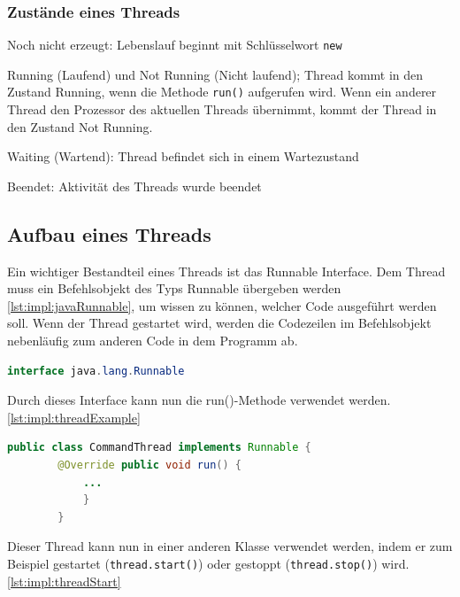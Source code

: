 \subsubsection{Zustände eines Threads}
\begin{compactitem}
    \item Noch nicht erzeugt: Lebenslauf beginnt mit Schlüsselwort \texttt{new}
    \item Running (Laufend) und Not Running (Nicht laufend); Thread kommt in den Zustand Running, wenn die Methode \texttt{run()} aufgerufen wird. Wenn ein anderer Thread den Prozessor des aktuellen Threads übernimmt, kommt der Thread in den Zustand Not Running.    
    \item Waiting (Wartend): Thread befindet sich in einem Wartezustand
    \item Beendet: Aktivität des Threads wurde beendet
\end{compactitem}
\cite{javaInselBuch} 

\subsection{Aufbau eines Threads}
Ein wichtiger Bestandteil eines Threads ist das Runnable Interface. 
Dem Thread muss ein Befehlsobjekt des Typs Runnable übergeben werden \ref{lst:impl:javaRunnable}, um wissen zu können, welcher Code ausgeführt werden soll.
Wenn der Thread gestartet wird, werden die Codezeilen im Befehlsobjekt nebenläufig zum anderen Code in dem Programm ab. \cite{javaInselBuch}
 
\begin{lstlisting}[language=java,caption=Java Runnable,label=lst:impl:javaRunnable]
    interface java.lang.Runnable
\end{lstlisting}
 
Durch dieses Interface kann nun die run()-Methode verwendet werden. \ref{lst:impl:threadExample}
 
\begin{lstlisting}[language=java,caption=Einfaches Thread Beispiel,label=lst:impl:threadExample]
    public class CommandThread implements Runnable { 
        @Override public void run() {   
            ...
            }
        }
\end{lstlisting}
 
Dieser Thread kann nun in einer anderen Klasse verwendet werden, indem er zum Beispiel gestartet (\texttt{thread.start()}) oder gestoppt (\texttt{thread.stop()}) wird. \ref{lst:impl:threadStart}
 
